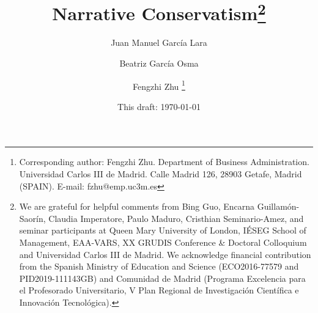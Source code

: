 \documentclass[letterpaper,12pt]{article}
\begin{document}
	
	\title{\textbf{Narrative Conservatism}\footnote{We are grateful for helpful comments from Bing Guo, Encarna Guillam\'on-Saor\'in, Claudia Imperatore, Paulo Maduro, Cristhian Seminario-Amez, and seminar participants at Queen Mary University of London, IÉSEG School of Management, EAA-VARS, XX GRUDIS Conference \& Doctoral Colloquium and Universidad Carlos III de Madrid. We acknowledge financial contribution from the Spanish Ministry of Education and Science (ECO2016-77579 and PID2019-111143GB) and Comunidad de Madrid (Programa Excelencia para el Profesorado Universitario, V Plan Regional de Investigación Científica e Innovación Tecnológica).}}
		
	\author{\normalsize \vspace{0.5cm}Juan Manuel Garc\'ia Lara}
	
	\author{Beatriz Garc\'ia Osma}
	
	\author{Fengzhi Zhu%
		\thanks{Corresponding author: Fengzhi Zhu. Department of Business Administration. Universidad Carlos III de Madrid. Calle Madrid 126, 28903 Getafe, Madrid (SPAIN). E-mail: fzhu@emp.uc3m.es}}
	
	
	\date{\small This draft: \today}
	
	\maketitle
	
\end{document}

